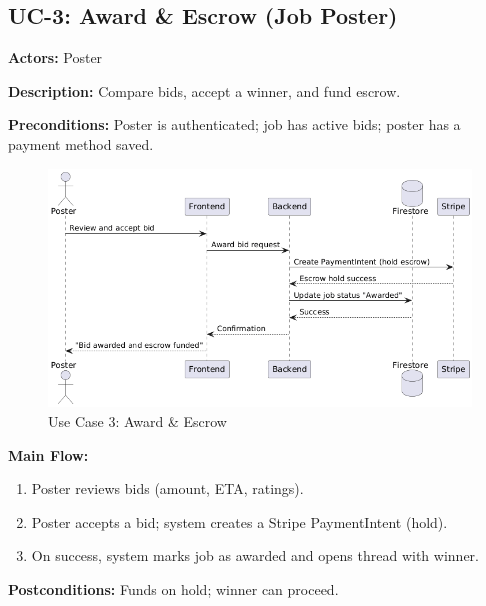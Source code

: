 \documentclass[11pt]{article}
\begin{document}
\subsection{UC-3: Award \& Escrow (Job Poster)}
\textbf{Actors:} Poster \par
\textbf{Description:} Compare bids, accept a winner, and fund escrow.\par
\textbf{Preconditions:} Poster is authenticated; job has active bids; poster has a payment method saved.\par
\begin{figure}[htbp]
  \centering
\includegraphics[width=0.9\linewidth]{UC-3.png}
  \caption{Use Case 3: Award \& Escrow}
  \label{fig:uc3}
\end{figure} \par
\textbf{Main Flow:}
\begin{enumerate}[leftmargin=1.4em]
  \item Poster reviews bids (amount, ETA, ratings).
  \item Poster accepts a bid; system creates a Stripe PaymentIntent (hold).
  \item On success, system marks job as awarded and opens thread with winner.
\end{enumerate}
\textbf{Postconditions:} Funds on hold; winner can proceed.
\end{document}
